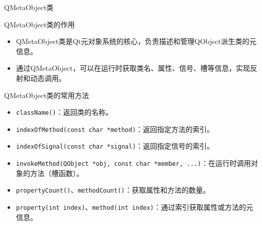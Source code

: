 \documentclass[UTF8,aspectratio=169]{beamer}
\begin{document}
\begin{frame}[fragile]{QMetaObject类}
    \begin{ytublock}{QMetaObject类的作用}
        \begin{itemize}
            \item QMetaObject类是Qt元对象系统的核心，负责描述和管理QObject派生类的元信息。
            \item 通过QMetaObject，可以在运行时获取类名、属性、信号、槽等信息，实现反射和动态调用。
        \end{itemize}
    \end{ytublock}
    \begin{ytublock}{QMetaObject类的常用方法}
        \begin{itemize}
            \item \texttt{className()}：返回类的名称。
            \item \texttt{indexOfMethod(const char *method)}：返回指定方法的索引。
            \item \texttt{indexOfSignal(const char *signal)}：返回指定信号的索引。
            \item \texttt{invokeMethod(QObject *obj, const char *member, ...)}：在运行时调用对象的方法（槽函数）。
            \item \texttt{propertyCount()}、\texttt{methodCount()}：获取属性和方法的数量。
            \item \texttt{property(int index)}、\texttt{method(int index)}：通过索引获取属性或方法的元信息。
        \end{itemize}
    \end{ytublock}
\end{frame}
\end{document}
